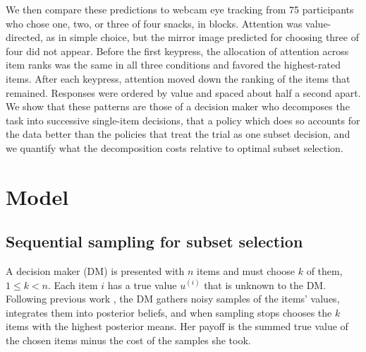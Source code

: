 \documentclass[10pt,letterpaper]{article}
\begin{document}
We then compare these predictions to webcam eye tracking from 75
participants who chose one, two, or three of four snacks, in blocks.
Attention was value-directed, as in simple choice, but the mirror image
predicted for choosing three of four did not appear. Before the first
keypress, the allocation of attention across item ranks was the same in
all three conditions and favored the highest-rated items. After each
keypress, attention moved down the ranking of the items that remained.
Responses were ordered by value and spaced about half a second apart. We
show that these patterns are those of a decision maker who decomposes
the task into successive single-item decisions, that a policy which does
so accounts for the data better than the policies that treat the trial
as one subset decision, and we quantify what the decomposition costs
relative to optimal subset selection.

\section*{Model}\label{model}

\subsection*{Sequential sampling for subset
selection}\label{sequential-sampling-for-subset-selection}

A decision maker (DM) is presented with \(n\) items and must choose
\(k\) of them, \(1 \le k < n\). Each item \(i\) has a true value
\(u^{(i)}\) that is unknown to the DM. Following previous work
\cite{krajbich2010,callaway2021,tajima2016}, the DM gathers noisy
samples of the items' values, integrates them into posterior beliefs,
and when sampling stops chooses the \(k\) items with the highest
posterior means. Her payoff is the summed true value of the chosen items
minus the cost of the samples she took.
\end{document}
